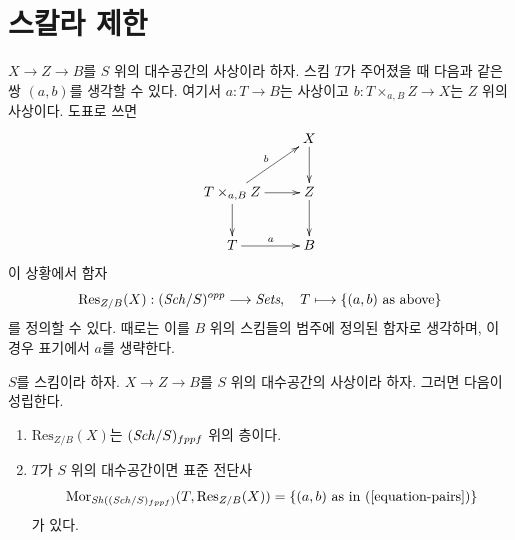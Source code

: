 \section{스칼라 제한}
\label{section-restriction-of-scalars}

\noindent
$X \to Z \to B$를 $S$ 위의 대수공간의 사상이라 하자.
스킴 $T$가 주어졌을 때 다음과 같은 쌍 $(a, b)$를 생각할 수 있다.
여기서 $a : T \to B$는 사상이고
$b : T \times_{a, B} Z \to X$는 $Z$ 위의 사상이다. 도표로 쓰면
\begin{equation}
\label{equation-pairs}
\vcenter{
\xymatrix{
& X \ar[d] \\
T \times_{a, B} Z \ar[d] \ar[ru]^b \ar[r] & Z \ar[d] \\
T \ar[r]^a & B
}
}
\end{equation}
이 상황에서 함자
\begin{equation}
\label{equation-restriction-of-scalars}
\text{Res}_{Z/B}(X) : (\mathit{Sch}/S)^{opp} \longrightarrow \textit{Sets},
\quad
T \longmapsto \{(a, b)\text{ as above}\}
\end{equation}
를 정의할 수 있다. 때로는 이를 $B$ 위의 스킴들의 범주에 정의된
함자로 생각하며, 이 경우 표기에서 $a$를 생략한다.

\begin{lemma}
\label{lemma-restriction-of-scalars-sheaf}
$S$를 스킴이라 하자. $X \to Z \to B$를
$S$ 위의 대수공간의 사상이라 하자. 그러면 다음이 성립한다.
\begin{enumerate}
\item $\text{Res}_{Z/B}(X)$는 $(\mathit{Sch}/S)_{fppf}$ 위의 층이다.
\item $T$가 $S$ 위의 대수공간이면 표준 전단사
$$
\mathop{\mathrm{Mor}}\nolimits_{\mathop{\mathit{Sh}}\nolimits((\mathit{Sch}/S)_{fppf})}(T, \text{Res}_{Z/B}(X))
=
\{(a, b)\text{ as in }(\ref{equation-pairs})\}
$$
가 있다.
\end{enumerate}
\end{lemma}

